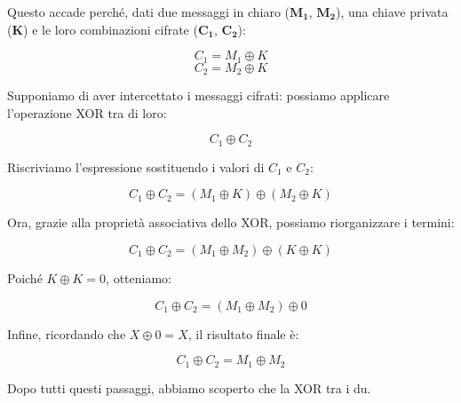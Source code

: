 \documentclass{rapport}
\begin{document}
Questo accade perché, dati due messaggi in chiaro (\(\mathbf{M_1}\), \(\mathbf{M_2}\)), una chiave privata (\(\mathbf{K}\)) e le loro combinazioni cifrate (\(\mathbf{C_1}\), \(\mathbf{C_2}\)):  

\begin{equation*}
    C_1 = M_1 \oplus K 
\end{equation*}
\begin{equation*}
    C_2 = M_2 \oplus K    
\end{equation*}

Supponiamo di aver intercettato i messaggi cifrati: possiamo applicare l'operazione XOR tra di loro:  

\begin{equation*}
    C_1 \oplus C_2
\end{equation*}

Riscriviamo l'espressione sostituendo i valori di \(C_1\) e \(C_2\):  

\begin{equation*}
    C_1 \oplus C_2 = (M_1 \oplus K ) \oplus (M_2 \oplus K)
\end{equation*}

Ora, grazie alla proprietà associativa dello XOR, possiamo riorganizzare i termini:  

\begin{equation*}
    C_1 \oplus C_2 = (M_1 \oplus M_2 ) \oplus (K \oplus K)
\end{equation*}

Poiché \(K \oplus K = 0\), otteniamo:  

\begin{equation*}
    C_1 \oplus C_2 = (M_1 \oplus M_2 ) \oplus 0
\end{equation*}

Infine, ricordando che \(X \oplus 0 = X\), il risultato finale è:  

\begin{equation*}
    C_1 \oplus C_2 = M_1 \oplus M_2 
\end{equation*}




Dopo tutti questi passaggi, abbiamo scoperto che la XOR tra i du.
\end{document}
